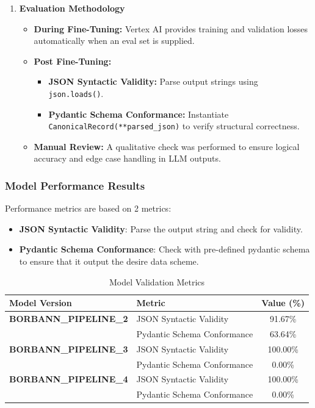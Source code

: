 \begin{enumerate}
    \item \textbf{Evaluation Methodology}

    \begin{itemize}
        \item \textbf{During Fine-Tuning:} Vertex AI provides training and validation losses automatically when an eval set is supplied.
        \item \textbf{Post Fine-Tuning:}
            \begin{itemize}
                \item \textbf{JSON Syntactic Validity:} Parse output strings using \texttt{json.loads()}.
                \item \textbf{Pydantic Schema Conformance:} Instantiate \texttt{CanonicalRecord(**parsed\_json)} to verify structural correctness.
            \end{itemize}
        \item \textbf{Manual Review:} A qualitative check was performed to ensure logical accuracy and edge case handling in LLM outputs.
    \end{itemize}
\end{enumerate}


\subsubsection{Model Performance Results}
Performance metrics are based on 2 metrics:
        \begin{itemize}
            \item \textbf{JSON Syntactic Validity}: Parse the output string and check for validity.
            \item \textbf{Pydantic Schema Conformance}: Check with pre-defined pydantic schema to ensure that it output the desire data scheme.
        \end{itemize}

\begin{table}[htbp]
    \centering
    \caption{Model Validation Metrics}
    \label{tab:pipeline_validation_metrics}
    \begin{tabular}{llc}
        \toprule
        \textbf{Model Version} & \textbf{Metric} & \textbf{Value (\%)} \\
        \midrule
        \textbf{BORBANN\_PIPELINE\_2} 
            & JSON Syntactic Validity & 91.67\% \\
            & Pydantic Schema Conformance & 63.64\% \\
        \midrule
        \textbf{BORBANN\_PIPELINE\_3} 
            & JSON Syntactic Validity & 100.00\% \\
            & Pydantic Schema Conformance & 0.00\% \\
        \midrule
        \textbf{BORBANN\_PIPELINE\_4} 
            & JSON Syntactic Validity & 100.00\% \\
            & Pydantic Schema Conformance & 0.00\% \\
        \bottomrule
    \end{tabular}
\end{table}



